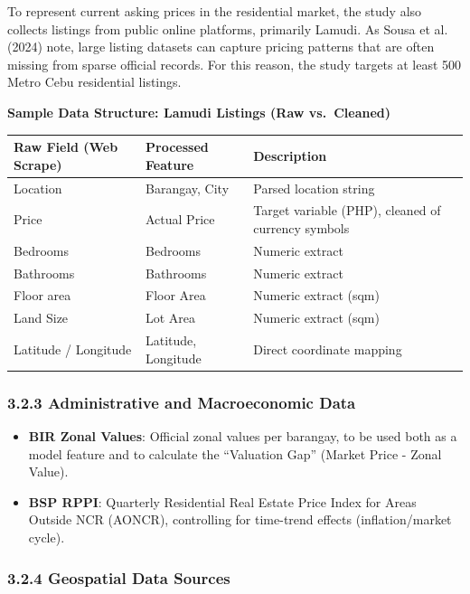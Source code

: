 To represent current asking prices in the residential market, the study also collects listings from public online platforms, primarily Lamudi. As Sousa et al. (2024) note, large listing datasets can capture pricing patterns that are often missing from sparse official records. For this reason, the study targets at least 500 Metro Cebu residential listings.

\textbf{Sample Data Structure: Lamudi Listings (Raw vs.~Cleaned)}

\begin{center}
\begin{tabular}{p{} p{} p{}}
\toprule
Raw Field (Web Scrape) & Processed Feature & Description \\
\midrule
Location & Barangay, City & Parsed location string \\
Price & Actual Price & Target variable (PHP), cleaned of currency symbols \\
Bedrooms & Bedrooms & Numeric extract \\
Bathrooms & Bathrooms & Numeric extract \\
Floor area & Floor Area & Numeric extract (sqm) \\
Land Size & Lot Area & Numeric extract (sqm) \\
Latitude / Longitude & Latitude, Longitude & Direct coordinate mapping \\
\bottomrule
\end{tabular}
\end{center}

\subsubsection{\texorpdfstring{\textbf{3.2.3 Administrative and Macroeconomic Data}}{3.2.3 Administrative and Macroeconomic Data}}\label{administrative-and-macroeconomic-data}

\begin{itemize}
\item \textbf{BIR Zonal Values}: Official zonal values per barangay, to be used both as a model feature and to calculate the ``Valuation Gap'' (Market Price - Zonal Value).
\item \textbf{BSP RPPI}: Quarterly Residential Real Estate Price Index for Areas Outside NCR (AONCR), controlling for time-trend effects (inflation/market cycle).
\end{itemize}

\subsubsection{\texorpdfstring{\textbf{3.2.4 Geospatial Data Sources}}{3.2.4 Geospatial Data Sources}}\label{geospatial-data-sources}

